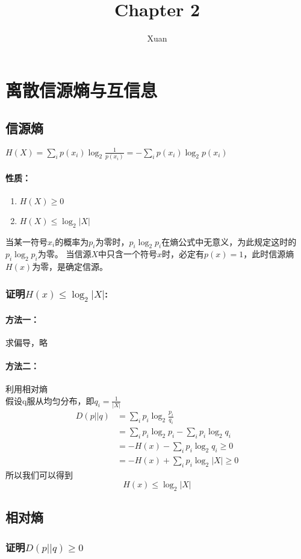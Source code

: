 \documentclass[a4paper, 12pt]{article}
\title{Chapter 2}
\author{Xuan}
\begin{document}
    \maketitle
    \section{离散信源熵与互信息}
    \subsection{信源熵}
    $H(X)=\sum_ip(x_i)\log_2\frac{1}{p(x_i)}=-\sum_ip(x_i)\log_2p(x_i)$
    \paragraph{性质：}
    \begin{enumerate}
        \item $H(X)\ge0$
        \item $H(X)\le\log_2|X|$
    \end{enumerate}
    当某一符号$x_i$的概率为$p_i$为零时，$p_i\log_2p_i$在熵公式中无意义，为此规定这时的$p_i\log_2p_i$为零。
    当信源$X$中只含一个符号$x$时，必定有$p(x)=1$，此时信源熵$H(x)$为零，是确定信源。
    \subsubsection{证明$H(x)\le\log_2|X|$:}
    \paragraph{方法一：} 求偏导，略
    \paragraph{方法二：} 利用相对熵\\
    假设q服从均匀分布，即$q_i=\frac{1}{|X|}$
    \begin{align}
        D(p||q)&=\sum_ip_i\log_2\frac{p_i}{q_i}\\
        &=\sum_ip_i\log_2p_i-\sum_ip_i\log_2q_i\\
        &=-H(x)-\sum_ip_i\log_2q_i\ge0\\
        &=-H(x)+\sum_ip_i\log_2|X|\ge0
    \end{align}
    所以我们可以得到
    \[H(x)\le\log_2|X|\]
    \subsection{相对熵}
    \subsubsection{证明$D(p||q)\ge0$}
\end{document}
